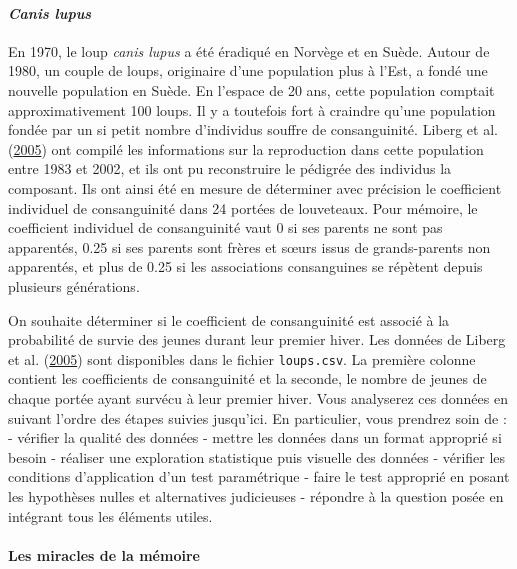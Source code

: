 \documentclass[a4paperpaper,]{article}
\let\oldparagraph\paragraph
\renewcommand{\paragraph}[1]{\oldparagraph{#1}\mbox{}}
\begin{document}
\hypertarget{canis-lupus}{%
\paragraph{\texorpdfstring{\emph{Canis lupus}}{Canis lupus}}\label{canis-lupus}}

En 1970, le loup \emph{canis lupus} a été éradiqué en Norvège et en Suède. Autour de 1980, un couple de loups, originaire d'une population plus à l'Est, a fondé une nouvelle population en Suède. En l'espace de 20 ans, cette population comptait approximativement 100 loups. Il y a toutefois fort à craindre qu'une population fondée par un si petit nombre d'individus souffre de consanguinité. Liberg et al. (\protect\hyperlink{ref-liberg2005}{2005}) ont compilé les informations sur la reproduction dans cette population entre 1983 et 2002, et ils ont pu reconstruire le pédigrée des individus la composant. Ils ont ainsi été en mesure de déterminer avec précision le coefficient individuel de consanguinité dans 24 portées de louveteaux.
Pour mémoire, le coefficient individuel de consanguinité vaut 0 si ses parents ne sont pas apparentés, 0.25 si ses parents sont frères et sœurs issus de grands-parents non apparentés, et plus de 0.25 si les associations consanguines se répètent depuis plusieurs générations.

On souhaite déterminer si le coefficient de consanguinité est associé à la probabilité de survie des jeunes durant leur premier hiver. Les données de Liberg et al. (\protect\hyperlink{ref-liberg2005}{2005}) sont disponibles dans le fichier \texttt{loups.csv}. La première colonne contient les coefficients de consanguinité et la seconde, le nombre de jeunes de chaque portée ayant survécu à leur premier hiver. Vous analyserez ces données en suivant l'ordre des étapes suivies jusqu'ici. En particulier, vous prendrez soin de :
- vérifier la qualité des données
- mettre les données dans un format approprié si besoin
- réaliser une exploration statistique puis visuelle des données
- vérifier les conditions d'application d'un test paramétrique
- faire le test approprié en posant les hypothèses nulles et alternatives judicieuses
- répondre à la question posée en intégrant tous les éléments utiles.

\hypertarget{les-miracles-de-la-memoire}{%
\paragraph{Les miracles de la mémoire}\label{les-miracles-de-la-memoire}}
\end{document}
